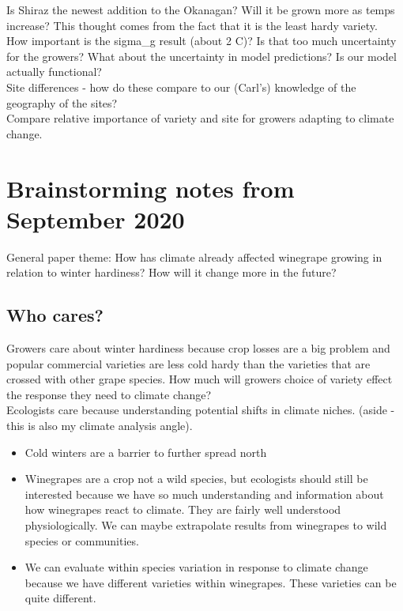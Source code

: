 \documentclass[11pt,letter]{article}
\begin{document}
Is Shiraz the newest addition to the Okanagan? Will it be grown more as temps increase? This thought comes from the fact that it is the least hardy variety. \\

How important is the sigma\_g result (about 2 \textdegree C)? Is that too much uncertainty for the growers? What about the uncertainty in model predictions? Is our model actually functional?\\


Site differences - how do these compare to our (Carl's) knowledge of the geography of the sites?\\


Compare relative importance of variety and site for growers adapting to climate change. \\

\section{Brainstorming notes from September 2020}

General paper theme: How has climate already affected winegrape growing in relation to winter hardiness? How will it change more in the future? \\

\subsection{Who cares?}

Growers care about winter hardiness because crop losses are a big problem and popular commercial varieties are less cold hardy than the varieties that are crossed with other grape species. How much will growers choice of variety effect the response they need to climate change? \\

Ecologists care because understanding potential shifts in climate niches. (aside - this is also my climate analysis angle). 
\begin{itemize}
  \item Cold winters are a barrier to further spread north  
  \item Winegrapes are a crop not a wild species, but ecologists should still be interested because we have so much understanding and information about how winegrapes react to climate. They are fairly well understood physiologically. We can maybe extrapolate results from winegrapes to wild species or communities. 
  \item We can evaluate within species variation in response to climate change because we have different varieties within winegrapes. These varieties can be quite different.   
\end{itemize}
\end{document}
